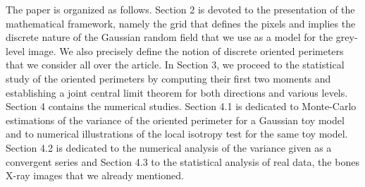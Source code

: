 \documentclass[12pt]{article}
\theoremstyle{Theorem}
\theoremstyle{definition}
\begin{document}
The paper is organized as follows. Section 2 is devoted to the presentation of the mathematical framework, namely the grid  that defines the pixels and implies the discrete nature of the Gaussian random field that we use as a model for the grey-level image. We also precisely define the notion of discrete oriented perimeters that we consider all over the article. In Section 3, we proceed to the statistical study of the oriented perimeters by computing their first two moments and establishing a joint central limit theorem for both directions and various levels. Section 4 contains the numerical studies. Section 4.1 is dedicated to Monte-Carlo estimations of the variance of the oriented perimeter for a Gaussian toy model and to numerical illustrations of the local isotropy test for the same toy model. Section 4.2 is dedicated to the numerical analysis of the variance given as a convergent series and Section 4.3 to the statistical analysis of real data, the bones X-ray images that we already mentioned.  

\bigskip
\bigskip
\end{document}
